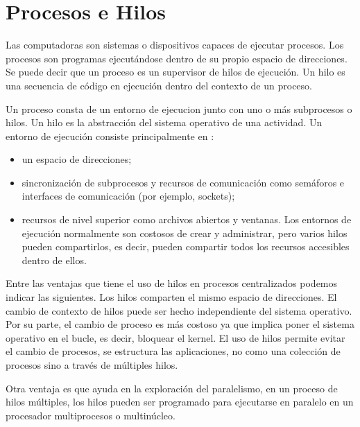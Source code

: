 

\chapter{Procesos e Hilos}  
\label{ch:Pro-Hil}
Las computadoras son sistemas o dispositivos capaces de ejecutar procesos.  
 Los \gls{procesos} son programas ejecutándose dentro de su propio espacio de direcciones. Se puede decir que un proceso es un supervisor de \gls{hilos} de ejecución. Un hilo es una secuencia de código en ejecución dentro del contexto de un proceso. \cite{Steen2017}

Un proceso consta de un \gls{entorno de ejecucion} junto con uno o más subprocesos o  hilos. Un hilo es la abstracción del sistema operativo de una actividad. Un entorno de ejecución
consiste principalmente en \cite{Coulouris2011}:
\begin{itemize}
	\item  un espacio de direcciones;
	\item sincronización de subprocesos y recursos de comunicación como semáforos e interfaces de comunicación (por ejemplo, sockets);
	\item recursos de nivel superior como archivos abiertos y ventanas. Los entornos de ejecución normalmente son costosos de crear y administrar, pero varios hilos pueden compartirlos, es decir, pueden compartir todos los recursos accesibles dentro de ellos.
\end{itemize}
 
 
Entre las ventajas que tiene el uso de hilos en procesos centralizados podemos indicar las siguientes. Los hilos comparten el mismo espacio de direcciones. El cambio de \gls{contexto de hilos} puede ser hecho independiente del sistema operativo. Por su parte, el cambio de proceso es más costoso ya que implica poner el sistema operativo en el bucle, es decir, bloquear el kernel. El uso de hilos permite evitar el cambio de procesos, se  estructura las  aplicaciones, no como una colección de procesos sino a través de múltiples hilos.

Otra ventaja es que ayuda en la exploración del paralelismo, en  un proceso de hilos múltiples, los hilos pueden ser programado para ejecutarse en paralelo en un procesador multiprocesos o multinúcleo. 
				

